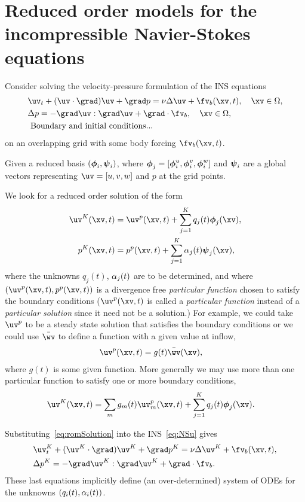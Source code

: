 \section{Reduced order models for the incompressible Navier-Stokes equations} \label{eq:romINS}

Consider solving the velocity-pressure formulation of the INS equations
\begin{align}
  & \uv_t + (\uv\cdot\grad)\uv + \grad p = \nu \Delta \uv + \fv_b(\xv,t) , \quad \xv \in\Omega,  \label{eq:NSu}\\
  & \Delta p = -\grad\uv : \grad\uv + \grad\cdot\fv_b , \quad \xv \in\Omega,  \\
  & \text{ Boundary and initial conditions...}
\end{align}
on an overlapping grid with some body forcing $\fv_b(\xv,t)$.

Given a reduced basis $(\boldsymbol{\phi}_i,\boldsymbol{\psi}_i)$, where $\boldsymbol{\phi}_j=[\boldsymbol{\phi}^u_i, \boldsymbol{\phi}^v_i, \boldsymbol{\phi}^w_i]$ and $\boldsymbol{\psi}_i$ are a global vectors
representing $\uv=[u,v,w]$ and $p$ at the grid points.

We look for a reduced order solution of the form
\begin{align}
   \uv^K(\xv,t) &= \uv^p(\xv,t) + \sum_{j=1}^K q_j(t)\phiv_j(\xv),  \label{eq:romSolution} \\ 
    p^K(\xv,t) &=  p^p(\xv,t) + \sum_{j=1}^K \qp_j(t) \psiv_j(\xv), 
\end{align}
where the unknowns $q_j(t)$, $\alpha_j(t)$ are to be determined, and 
where $(\uv^p(\xv,t),p^p(\xv,t))$ is a divergence free {\em particular function} chosen to satisfy the boundary conditions 
($\uv^p(\xv,t)$ is called a  {\em particular function} instead of a {\em particular solution} since it need not be
a solution.)
For example, we could take $\uv^p$ to be a steady state solution that satisfies the boundary
conditions or we could use $\wvBar$ to define a function with a given value at inflow,
\begin{align}
   \uv^p(\xv,t) &= g(t)\wvBar(\xv),
\end{align}
where $g(t)$ is some given function. 
More generally we may use more than one particular function to satisfy one or more boundary conditions,
\begin{align}
   \uv^K(\xv,t) &= \sum_m g_m(t)\uv^p_m(\xv,t)  + \sum_{j=1}^K q_j(t)\phiv_j(\xv)  . 
\end{align}


Substituting~\eqref{eq:romSolution} into the INS~\eqref{eq:NSu} gives
\begin{align}
  & \uv^K_t + (\uv^K\cdot\grad)\uv^K + \grad p^K = \nu \Delta \uv^K + \fv_b(\xv,t),  \label{eq:romEquation} \\
  & \Delta p^K = -\grad\uv^K : \grad\uv^K + \grad\cdot\fv_b .
\end{align}
These last equations implicitly define (an over-determined) system of ODEs for the unknowns $(q_i(t),\alpha_i(t))$. 


